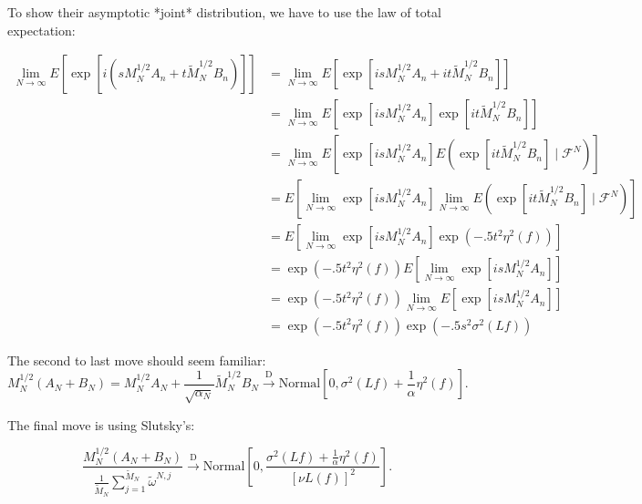 \documentclass{article}
\begin{document}
To show their asymptotic *joint* distribution, we have to use the law of total expectation:

\begin{align*}
\lim_{N \to \infty}E\left[ \exp\left[i \left(sM_N^{1/2}A_n + t\tilde{M}_N^{1/2} B_n  \right) \right] \right] 
&= \lim_{N \to \infty}E\left[ \exp\left[i sM_N^{1/2}A_n + it\tilde{M}_N^{1/2} B_n   \right] \right] \\
&= \lim_{N \to \infty}E\left[ \exp\left[i sM_N^{1/2}A_n\right]\exp\left[ it\tilde{M}_N^{1/2} B_n   \right] \right] \\
&= \lim_{N \to \infty}E\left[ \exp\left[i sM_N^{1/2}A_n\right] E\left( \exp\left[ it\tilde{M}_N^{1/2} B_n   \right] \mid \mathcal{F}^N\right) \right] \\
&= E\left[ \lim_{N \to \infty}\exp\left[i sM_N^{1/2}A_n\right]\lim_{N \to \infty} E\left( \exp\left[ it\tilde{M}_N^{1/2} B_n   \right] \mid \mathcal{F}^N\right) \right] \tag{DCT} \\
&= E\left[ \lim_{N \to \infty}\exp\left[i sM_N^{1/2}A_n\right] \exp\left(-.5t^2\eta^2(f) \right) \right] \\
&= \exp\left(-.5t^2\eta^2(f) \right) E\left[ \lim_{N \to \infty}\exp\left[i sM_N^{1/2}A_n\right]  \right] \\
&= \exp\left(-.5t^2\eta^2(f) \right) \lim_{N \to \infty} E\left[ \exp\left[i sM_N^{1/2}A_n\right]  \right] \tag{DCT} \\
&= \exp\left(-.5t^2\eta^2(f) \right) \exp\left(- .5s^2\sigma^2(Lf) \right)
\end{align*}

The second to last move should seem familiar:
$$
M_N^{1/2}(A_N + B_N) = M_N^{1/2}A_N + \frac{1}{\sqrt{\alpha_N}} \tilde{M}_N^{1/2} B_N \overset{\text{D}}{\to} \text{Normal}\left[0, \sigma^2(Lf) + \frac{1}{\alpha}\eta^2(f) \right].
$$

The final move is using Slutsky's:

$$
\frac{M_N^{1/2}(A_N + B_N)}{\frac{1}{\tilde{M}_N} \sum_{j=1}^{\tilde{M}_N} \tilde{\omega}^{N,j}}  \overset{\text{D}}{\to} \text{Normal}\left[0, \frac{\sigma^2(Lf) + \frac{1}{\alpha} \eta^2(f)}{[\nu L (f) ]^2} \right].
$$
\end{document}
